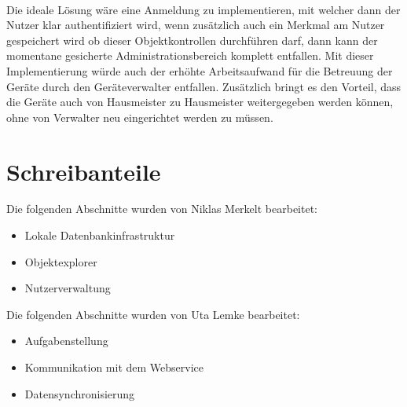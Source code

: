 \documentclass[12pt]{article}
\begin{document}
\paragraph{}Die ideale Lösung wäre eine Anmeldung zu implementieren, mit welcher dann der Nutzer klar authentifiziert wird, wenn zusätzlich auch ein Merkmal am Nutzer gespeichert wird ob dieser Objektkontrollen durchführen darf, dann kann der momentane gesicherte Administrationsbereich komplett entfallen. Mit dieser Implementierung würde auch der erhöhte Arbeitsaufwand für die Betreuung der Geräte durch den Geräteverwalter entfallen. Zusätzlich bringt es den Vorteil, dass die Geräte auch von Hausmeister zu Hausmeister weitergegeben werden können, ohne von Verwalter neu eingerichtet werden zu müssen.

\section{Schreibanteile}

Die folgenden Abschnitte wurden von Niklas Merkelt bearbeitet:
\begin{itemize}
	\item Lokale Datenbankinfrastruktur
	\item Objektexplorer
	\item Nutzerverwaltung
\end{itemize}
Die folgenden Abschnitte wurden von Uta Lemke bearbeitet:
\begin{itemize}
	\item Aufgabenstellung
	\item Kommunikation mit dem Webservice
	\item Datensynchronisierung
\end{itemize}
\end{document}
